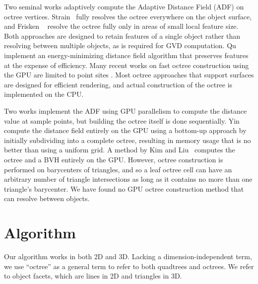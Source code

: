 \documentclass{egpubl}
\begin{document}
Two seminal works adaptively compute the Adaptive Distance Field (ADF) on octree vertices.  Strain~ fully resolves the octree everywhere on the object surface, and Frisken \etal~ resolve the octree fully only in areas of small local feature size.  Both approaches are designed to retain features of a single object rather than resolving between multiple objects, as is required for GVD computation.  Qu \etal {} implement an energy-minimizing distance field algorithm that preserves features at the expense of efficiency.  Many recent works on fast octree construction using the GPU are limited to point sites \cite{bedorf2012sparse,karras2012maximizing,zhou2011data}. Most octree approaches that support surfaces \cite{baert2013out,crassin2009gigavoxels,laine2011efficient,lefebvre2007compressed} are designed for efficient rendering, and actual construction of the octree is implemented on the CPU.

Two works \cite{bastos2008gpu,park2010cuda} implement the ADF using GPU parallelism to compute the distance value at sample points, but building the octree itself is done sequentially.  Yin \etal~ compute the distance field entirely on the GPU using a bottom-up approach by initially subdividing into a complete octree, resulting in memory usage that is no better than using a uniform grid.  A method by Kim and Liu~ computes the octree and a BVH entirely on the GPU. However, octree construction is performed on barycenters of triangles, and so a leaf octree cell can have an arbitrary number of triangle intersections as long as it contains no more than one triangle's barycenter.  We have found no GPU octree construction method that can resolve between objects.

\section{Algorithm}
\label{sec:algorithm}
Our algorithm works in both 2D and 3D. Lacking a dimension-independent term, we use ``octree'' as a general term to refer to both quadtrees and octrees. We refer to object facets, which are lines in 2D and triangles in 3D.
\end{document}
